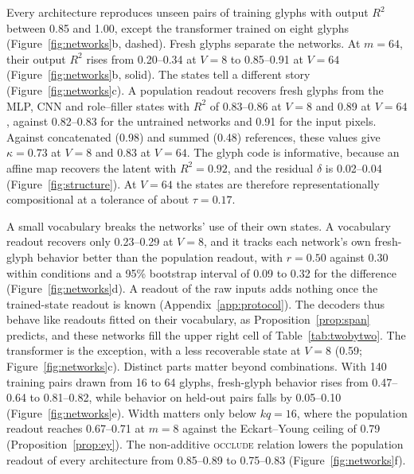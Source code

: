 Every architecture reproduces unseen pairs of training glyphs with output $R^2$ between 0.85 and 1.00, except the transformer trained on eight glyphs (Figure~\ref{fig:networks}b, dashed). Fresh glyphs separate the networks. At $m = 64$, their output $R^2$ rises from 0.20--0.34 at $V = 8$ to 0.85--0.91 at $V = 64$ (Figure~\ref{fig:networks}b, solid). The states tell a different story (Figure~\ref{fig:networks}c). A population readout recovers fresh glyphs from the MLP, CNN and role--filler states with $R^2$ of 0.83--0.86 at $V = 8$ and 0.89 at $V = 64$, against 0.82--0.83 for the untrained networks and 0.91 for the input pixels. Against concatenated (0.98) and summed (0.48) references, these values give $\kappa = 0.73$ at $V = 8$ and $0.83$ at $V = 64$. The glyph code is informative, because an affine map recovers the latent with $R^2 = 0.92$, and the residual $\delta$ is 0.02--0.04 (Figure~\ref{fig:structure}). At $V = 64$ the states are therefore representationally compositional at a tolerance of about $\tau = 0.17$.

A small vocabulary breaks the networks' use of their own states. A vocabulary readout recovers only 0.23--0.29 at $V = 8$, and it tracks each network's own fresh-glyph behavior better than the population readout, with $r = 0.50$ against $0.30$ within conditions and a 95\% bootstrap interval of 0.09 to 0.32 for the difference (Figure~\ref{fig:networks}d). A readout of the raw inputs adds nothing once the trained-state readout is known (Appendix~\ref{app:protocol}). The decoders thus behave like readouts fitted on their vocabulary, as Proposition~\ref{prop:span} predicts, and these networks fill the upper right cell of Table~\ref{tab:twobytwo}. The transformer is the exception, with a less recoverable state at $V = 8$ (0.59; Figure~\ref{fig:networks}c). Distinct parts matter beyond combinations. With 140 training pairs drawn from 16 to 64 glyphs, fresh-glyph behavior rises from 0.47--0.64 to 0.81--0.82, while behavior on held-out pairs falls by 0.05--0.10 (Figure~\ref{fig:networks}e). Width matters only below $kq = 16$, where the population readout reaches 0.67--0.71 at $m = 8$ against the Eckart--Young ceiling of 0.79 (Proposition~\ref{prop:ey}). The non-additive \textsc{occlude} relation lowers the population readout of every architecture from 0.85--0.89 to 0.75--0.83 (Figure~\ref{fig:networks}f).

